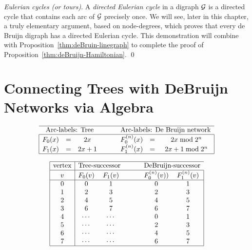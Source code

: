 \medskip

{\it Eulerian cycles (or tours)}. 
 A {\it directed Eulerian cycle} in a digraph
$\mbox{$\cal G$}$ is a directed cycle that contains each arc of $\mbox{$\cal G$}$ precisely
once.  We will see, later in this chapter, a truly elementary
argument, based on node-degrees, which proves that every de Bruijn
digraph has a directed Eulerian cycle.  This demonstration will
combine with Proposition~\ref{thm:deBruin-linegraph} to complete the
proof of Proposition~\ref{thm:deBruijn-Hamiltonian}.  \qed



\section{Connecting Trees with DeBruijn Networks via Algebra} 
\label{Appendix:tree-DB}




\[
\begin{array}{|ccccccc|}
\hline
\multicolumn{3}{c}{\mbox{Arc-labels: Tree}} & \hspace*{.2in}& \multicolumn{3}{c}{\mbox{Arc-labels: De Bruijn network}} \\
\hline 
F_0(x) & = & 2x      &  &  F^{(n)}_0(x) & = & 2x \bmod 2^n \\
F_1(x) & = & 2x+1  &  &  F^{(n)}_1(x) & = & 2x +1 \bmod 2^n \\ 
\hline
\end{array}
\]

\[
\begin{array}{|c|ccccc|}
\hline
\mbox{vertex} & \multicolumn{2}{c}{\mbox{Tree-successor}} & \hspace*{.2in} & \multicolumn{2}{c}{\mbox{DeBruijn-successor}} \\
\hline
v & F_0(v) & F_1(v) & & F^{(n)}_0(v))& F^{(n)}_1(v) \\
\hline
0 & 0 & 1 & & 0 & 1 \\ 
1 & 2 & 3 & & 2 & 3 \\
2 & 4 & 5 & & 4 & 5 \\
3 & 6 & 7 & & 6 & 7 \\
4 & \cdots & \cdots  & & 0 & 1 \\
5 & \cdots & \cdots  & & 2 & 3 \\
6 & \cdots & \cdots  & & 4 & 5 \\
7 & \cdots & \cdots  & & 6 & 7 \\
\hline
\end{array}
\]